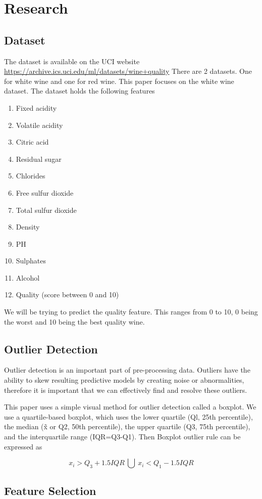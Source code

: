 \section{Research}

\subsection{Dataset}

The dataset is available on the UCI website \url{https://archive.ics.uci.edu/ml/datasets/wine+quality} There are 2 datasets. One for white wine and one for red wine. This paper focuses on the white wine dataset. The dataset holds the following features

\begin{enumerate}
  \item Fixed acidity 
  \item Volatile acidity
  \item Citric acid 
  \item Residual sugar 
  \item Chlorides
  \item Free sulfur dioxide 
  \item Total sulfur dioxide 
  \item Density
  \item PH
  \item Sulphates
  \item Alcohol
  \item Quality (score between 0 and 10)
\end{enumerate}

We will be trying to predict the quality feature. This ranges from 0 to 10, 0 being the worst and 10 being the best quality wine.

\subsection{Outlier Detection}

Outlier detection is an important part of pre-processing data. Outliers have the ability to skew resulting predictive models by creating noise or abnormalities, therefore it is important that we can effectively find and resolve these outliers.

This paper uses a simple visual method for outlier detection called a boxplot.
We use a quartile-based boxplot, which uses the lower quartile (Ql, 25th percentile), the median (x̃  or Q2, 50th percentile), the upper quartile (Q3, 75th percentile), and the interquartile range (IQR=Q3-Q1). Then Boxplot outlier rule can be expressed as\cite{6520712}

\begin{equation}
x_{i} > Q_{3}+1.5IQR\ \bigcup \ x_{i} < Q_{1}-1.5IQR
\end{equation}

\subsection{Feature Selection}


